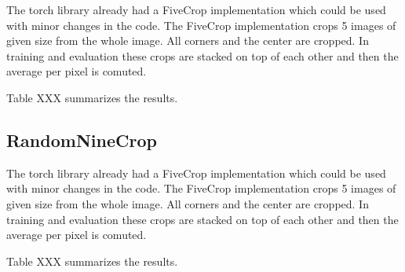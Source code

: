 The torch library already had a FiveCrop implementation which could be used with minor changes in the code. The FiveCrop implementation crops 5 images of given size from the whole image. All corners and the center are cropped. In training and evaluation these crops are stacked on top of each other and then the average per pixel is comuted.

Table XXX summarizes the results.

\begin{table}[h] \centering
{}
\caption{Resnet18 FiveCrop Implementation with and without pre-training. FINAL (regular) means ResNet18 with the resizing of the image instead of cropping and averaging}
\label{tbl:resnet18-fivecrop}
\end{table}

\subsection{RandomNineCrop}

The torch library already had a FiveCrop implementation which could be used with minor changes in the code. The FiveCrop implementation crops 5 images of given size from the whole image. All corners and the center are cropped. In training and evaluation these crops are stacked on top of each other and then the average per pixel is comuted.

Table XXX summarizes the results.

\begin{table}[h] \centering
{}
\caption{Resnet18 FiveCrop Implementation with and without pre-training. FINAL (regular) means ResNet18 with the resizing of the image instead of cropping and averaging}
\label{tbl:resnet18-randomnine}
\end{table}

